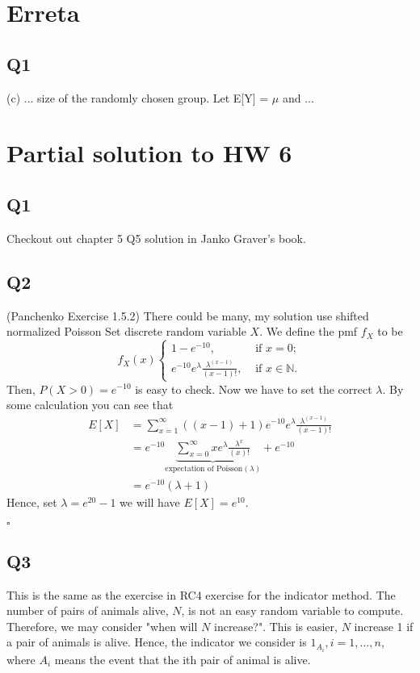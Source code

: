 \documentclass[12pt]{article}
\begin{document}
\section*{Erreta}
\subsection*{Q1}
(c) ... size of the randomly chosen group. Let E[\color{red}Y\color{black}] = \(\mu\) and ... 


\section*{Partial solution to HW 6}

\subsection*{Q1}
Checkout out chapter 5 Q5 solution in Janko Graver's book. 
\subsection*{Q2}
(Panchenko Exercise 1.5.2)
There could be many, my solution use shifted normalized Poisson 
Set discrete random variable \(X\). We define the pmf \(f_X\) to be \\
\[ 
    f_{X}(x) 
    \begin{cases}
      1-e^{-10}  , &\text{ if } x = 0 ;\\
      e^{-10}e^\lambda \frac{\lambda^{(x-1)}}{(x-1)!}  , &\text{ if } x \in \mathbb{N} .
    \end{cases}
\]
Then, \(P(X > 0) = e^{-10}\) is easy to check. Now we have to set the correct \(\lambda \). 
By some calculation you can see that 
\begin{equation*}
    \begin{aligned}
    E[X] &= \sum_{x=1}^{\infty}((x-1) + 1) e^{-10}e^\lambda \frac{\lambda^{(x-1)}}{(x-1)!} 
        \\ &= e^{-10}\underbrace{\sum_{x=0}^{\infty}x e^\lambda \frac{\lambda^{x}}{(x)!}}_{\text{expectation of Poisson}(\lambda ) } + e^{-10}
        \\ &= e^{-10}(\lambda +1)
    \end{aligned}
\end{equation*}
Hence, set \(\lambda  = e^{20} -1\) we will have \(E[X] = e^{10} \).   

\hspace{\textwidth}\(\square\) 
\subsection*{Q3}
This is the same as the exercise in RC4 exercise for the indicator method. 
The number of pairs of animals alive, \(N\), is not an easy random variable to compute. Therefore, we may consider "when will \(N\) increase?". 
This is easier, \(N\) increase 1 if a pair of animals is alive.
Hence, the indicator we consider is \(1_{A_i}, i = 1,\dots, n\), where \(A_i\) means the event that the ith pair of animal is alive. 
\end{document}
